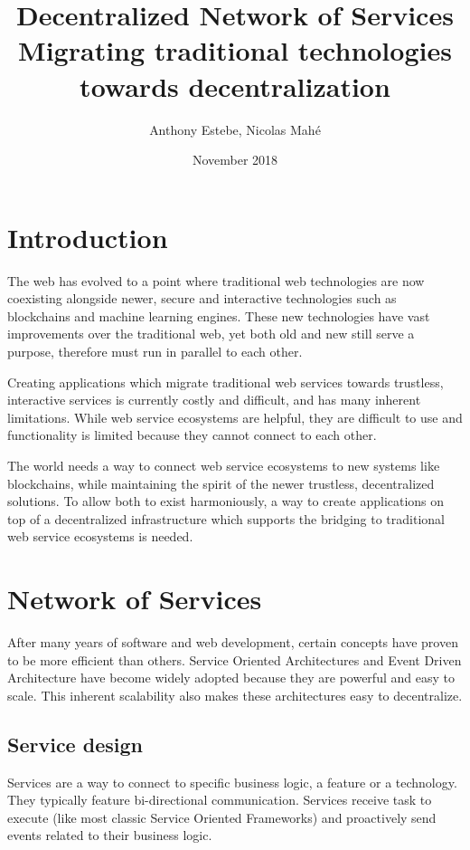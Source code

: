 \documentclass{article}
\title{Decentralized Network of Services \\ \small{Migrating traditional technologies towards decentralization}}
\author{Anthony Estebe, Nicolas Mahé}
\date{November 2018}
\begin{document}
\maketitle

\section{Introduction}

The web has evolved to a point where traditional web technologies are now coexisting alongside newer, secure and interactive technologies such as blockchains and machine learning engines. These new technologies have vast improvements over the traditional web, yet both old and new still serve a purpose, therefore must run in parallel to each other. 

Creating applications which migrate traditional web services towards trustless, interactive services is currently costly and difficult, and has many inherent limitations. While web service ecosystems are helpful, they are difficult to use and functionality is limited because they cannot connect to each other.

The world needs a way to connect web service ecosystems to new systems like blockchains, while maintaining the spirit of the newer trustless, decentralized solutions. To allow both to exist harmoniously, a way to create applications on top of a decentralized infrastructure which supports the bridging to traditional web service ecosystems is needed.

\section{Network of Services}

After many years of software and web development, certain concepts have proven to be more efficient than others. Service Oriented Architectures and Event Driven Architecture have become widely adopted because they are powerful and easy to scale. This inherent scalability also makes these architectures easy to decentralize.

\subsection{Service design}

Services are a way to connect to specific business logic, a feature or a technology. They typically feature bi-directional communication. Services receive task to execute (like most classic Service Oriented Frameworks) and proactively send events related to their business logic.
\end{document}
